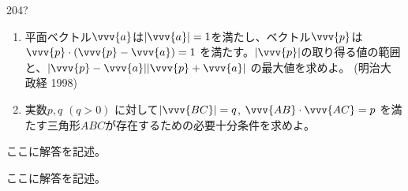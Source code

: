 \begin{prob}{204}{\hosi ?}{}
 \begin{enumerate}
  \item 平面ベクトル$\vvv{a}$は$|\vvv{a}|=1$を満たし、ベクトル$\vvv{p}$は$\vvv{p}\cdot(\vvv{p}-\vvv{a})=1$ を満たす。$|\vvv{p}|$の取り得る値の範囲と、$|\vvv{p}-\vvv{a}| |\vvv{p}+\vvv{a}|$ の最大値を求めよ。 (明治大 政経 1998)
  \item 実数$p, q$ $(q>0)$ に対して$|\vvv{BC}|=q$, $\vvv{AB}\cdot\vvv{AC}=p$ を満たす三角形$ABC$が存在するための必要十分条件を求めよ。
 \end{enumerate}
\end{prob}
ここに解答を記述。

ここに解答を記述。